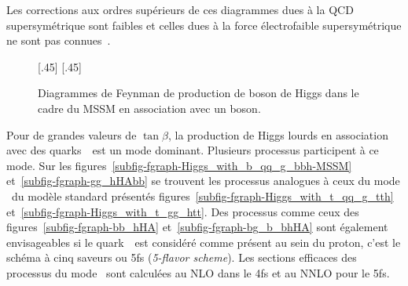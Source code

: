 Les corrections aux ordres supérieurs de ces diagrammes dues à la QCD supersymétrique sont faibles et celles dues à la force électrofaible supersymétrique ne sont pas connues~\cite{Higgs_xsec_book_1}.
\begin{figure}[h]
\centering
\vspace{\baselineskip}
[.45\textwidth]
{\vspace{\baselineskip}}
\hfill
{}[.45\textwidth]
{\vspace{\baselineskip}}
\caption[Production de boson de Higgs du MSSM en association avec un boson.]{Diagrammes de Feynman de production de boson de Higgs dans le cadre du MSSM en association avec un boson.}
\label{fig-fgraph-Higgs_prod_VH_ggZh-MSSM}
\end{figure}
\par Pour de grandes valeurs de $\tan\beta$, la production de Higgs lourds en association avec des quarks~\quarkb\ est un mode dominant.
Plusieurs processus participent à ce mode.
Sur les figures~\ref{subfig-fgraph-Higgs_with_b_qq_g_bbh-MSSM} et~\ref{subfig-fgraph-gg_hHAbb} se trouvent les processus analogues à ceux du mode \quarkt\antiquarkt\higgs\ du modèle standard présentés figures~\ref{subfig-fgraph-Higgs_with_t_qq_g_tth} et~\ref{subfig-fgraph-Higgs_with_t_gg_htt}.
Des processus comme ceux des figures~\ref{subfig-fgraph-bb_hHA} et~\ref{subfig-fgraph-bg_b_bhHA} sont également envisageables si le quark~\quarkb\ est considéré comme présent au sein du proton, c'est le \og schéma à cinq saveurs \fg{} ou 5fs (\emph{5-flavor scheme}).
Les sections efficaces des processus du mode \quarkb\antiquarkb\higgs\ sont calculées au NLO dans le 4fs et au NNLO pour le 5fs.
